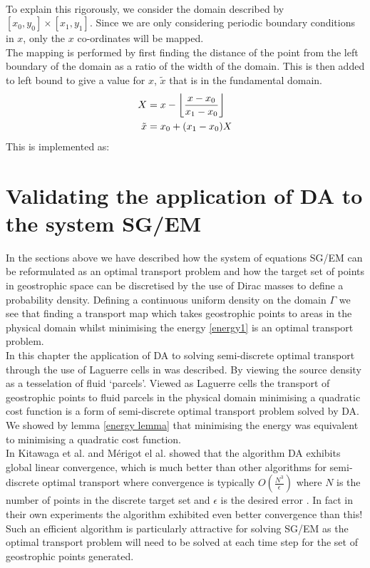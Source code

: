 \\
To explain this rigorously, we consider the domain described by $[x_0,y_0] \times [x_1,y_1]$. Since we are only considering periodic boundary conditions in $x$, only the $x$ co-ordinates will be mapped. 
\\
The mapping is performed by first finding the distance of the point from the left boundary of the domain as a ratio of the width of the domain. This is then added to left bound to give a value for $x$, $\tilde{x}$ that is in the fundamental domain. 
\begin{equation*}
	\begin{aligned}
		X &= x - \floor*{\frac{x - x_0}{x_1 - x_0}}\\
		\tilde{x} &= x_0 + (x_1 - x_0)X
	\end{aligned}
\end{equation*}
This is implemented as:
\section{Validating the application of DA to the system SG/EM}
In the sections above we have described how the system of equations SG/EM can be reformulated as an optimal transport problem and how the target set of points in geostrophic space can be discretised by the use of Dirac masses to define a probability density. Defining a continuous uniform density on the domain $\Gamma$ we see that finding a transport map which takes geostrophic points to areas in the physical domain whilst minimising the energy \ref{energy1} is an optimal transport problem.
\\
\linebreak
In this chapter the application of DA to solving semi-discrete optimal transport through the use of Laguerre cells in \cite{Merigot2017,Kitagawa2016} was described.  By viewing the source density as a tesselation of fluid \textquoteleft parcels\textquoteright. Viewed as Laguerre cells the transport of geostrophic points to fluid parcels in the physical domain minimising a quadratic cost function is a form of semi-discrete optimal transport problem solved by DA. We showed by lemma \ref{energy lemma} that minimising the energy was equivalent to minimising a quadratic cost function.
\\
\linebreak
In Kitawaga et al. \cite{Kitagawa2016} and M\'{e}rigot el al. \cite{Merigot2017} showed that the algorithm DA exhibits global linear convergence, which is much better than other algorithms for semi-discrete optimal transport where convergence is typically $O\left(\frac{N^3}{\epsilon}\right)$ where $N$ is the number of points in the discrete target set and $\epsilon$ is the desired error \cite{Kitagawa2016}. In fact in their own experiments the algorithm exhibited even better convergence than this!  Such an efficient algorithm is particularly attractive for solving SG/EM as the optimal transport problem will need to be solved at each time step for the set of geostrophic points generated.
